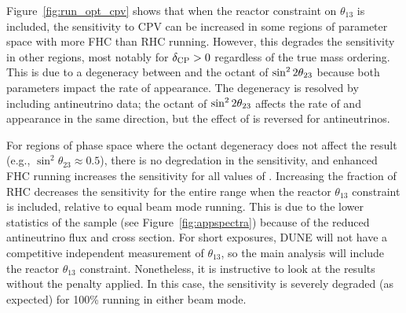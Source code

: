 
Figure~\ref{fig:run_opt_cpv} shows that when the reactor constraint on $\theta_{13}$ is included, the sensitivity to CPV can be increased in some regions of \deltacp parameter space with more FHC than RHC running. However, this degrades the sensitivity in other regions, most notably for $\delta_{\rm CP} > 0$ regardless of the true mass ordering. This is due to a degeneracy between \deltacp and the octant of $\sin^22\theta_{23}$ because both parameters impact the rate of \nue appearance. The degeneracy is resolved by including antineutrino data; the octant of $\sin^22\theta_{23}$ affects the rate of \nue and \anue appearance in the same direction, but the effect of \deltacp is reversed for antineutrinos.

For regions of phase space where the octant degeneracy does not affect the result (e.g., $\sin^{2}\theta_{23} \approx 0.5$), there is no degredation in the sensitivity, and enhanced FHC running increases the sensitivity for all values of \deltacp. Increasing the fraction of RHC decreases the sensitivity for the entire \deltacp range when the reactor $\theta_{13}$ constraint is included, relative to equal beam mode running. This is due to the lower statistics of the \anue sample (see Figure~\ref{fig:appspectra}) because of the reduced antineutrino flux and cross section. For short exposures, DUNE will not have a competitive independent measurement of $\theta_{13}$, so the main analysis will include the reactor $\theta_{13}$ constraint. Nonetheless, it is instructive to look at the results without the penalty applied. In this case, the sensitivity is severely degraded (as expected) for 100\% running in either beam mode.


